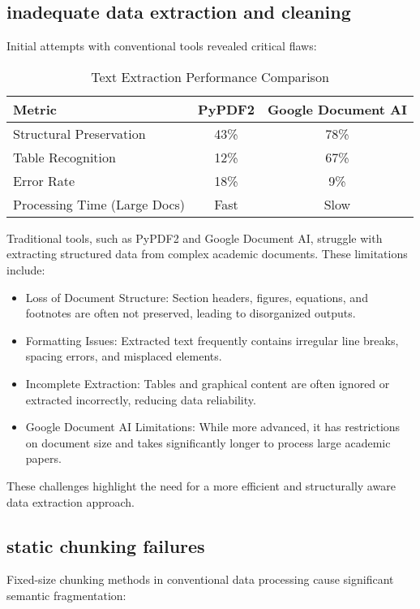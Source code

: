 \documentclass[conference]{IEEEtran}
\begin{document}
\subsection{inadequate data extraction and cleaning}  
Initial attempts with conventional tools revealed critical flaws:  

\begin{table}[h]  
\caption{Text Extraction Performance Comparison}  
\begin{tabularx}{\linewidth}{lcc}  
\toprule  
\textbf{Metric} & \textbf{PyPDF2} & \textbf{Google Document AI} \\  
\midrule  
Structural Preservation & 43\% & 78\% \\  
Table Recognition & 12\% & 67\% \\  
Error Rate & 18\% & 9\% \\  
Processing Time (Large Docs) & Fast & Slow \\  
\bottomrule  
\end{tabularx}  
\end{table}  

Traditional tools, such as PyPDF2 and Google Document AI, struggle with extracting structured data from complex academic documents. These limitations include:  

\begin{itemize}  
    \item Loss of Document Structure: Section headers, figures, equations, and footnotes are often not preserved, leading to disorganized outputs.  
    \item Formatting Issues: Extracted text frequently contains irregular line breaks, spacing errors, and misplaced elements.  
    \item Incomplete Extraction: Tables and graphical content are often ignored or extracted incorrectly, reducing data reliability.  
    \item Google Document AI Limitations: While more advanced, it has restrictions on document size and takes significantly longer to process large academic papers.  
\end{itemize}  

These challenges highlight the need for a more efficient and structurally aware data extraction approach.  

\subsection{static chunking failures}  
Fixed-size chunking methods in conventional data processing cause significant semantic fragmentation:  
\end{document}
